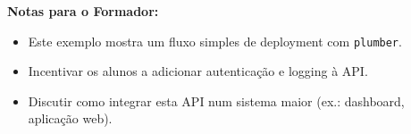 \textbf{Notas para o Formador:}
\begin{itemize}
  \item Este exemplo mostra um fluxo simples de deployment com \texttt{plumber}.
  \item Incentivar os alunos a adicionar autenticação e logging à API.
  \item Discutir como integrar esta API num sistema maior (ex.: dashboard, aplicação web).
\end{itemize}
